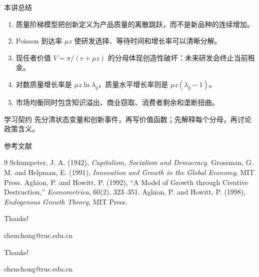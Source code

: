 \documentclass[aspectratio=32]{beamer}
\begin{document}
\begin{frame}{本讲总结}
\small
\begin{enumerate}
  \item 质量阶梯模型把创新定义为产品质量的离散跳跃，而不是新品种的连续增加。
  \item Poisson 到达率 $\mu z$ 使研发选择、等待时间和增长率可以清晰分解。
  \item 现任者价值 $V=\pi/(r+\mu z)$ 的分母体现创造性破坏：未来研发会终止当前租金。
  \item 对数质量增长率是 $\mu z\ln\lambda_q$，质量水平增长率则是 $\mu z(\lambda_q-1)$。
  \item 市场均衡同时包含知识溢出、商业窃取、消费者剩余和垄断扭曲。
\end{enumerate}
\begin{block}{学习契约}
先分清状态变量和创新事件，再写价值函数；先解释每个分母，再讨论政策含义。
\end{block}
\end{frame}

\begin{frame}{参考文献}
\scriptsize
\begin{thebibliography}{9}
 Schumpeter, J. A. (1942), \emph{Capitalism, Socialism and Democracy}.
 Grossman, G. M. and Helpman, E. (1991), \emph{Innovation and Growth in the Global Economy}, MIT Press.
 Aghion, P. and Howitt, P. (1992), ``A Model of Growth through Creative Destruction,'' \emph{Econometrica}, 60(2), 323--351.
 Aghion, P. and Howitt, P. (1998), \emph{Endogenous Growth Theory}, MIT Press.
\end{thebibliography}
\vfill
\begin{center}
{\color{LectureBlue}\Huge Thanks!}\par
\vspace{0.16cm}
\large chenchong@ruc.edu.cn
\end{center}
\end{frame}

\begin{frame}[plain]
\begin{center}
\vfill
{\color{LectureBlue}\Huge Thanks!}\par
\vspace{0.35cm}
\large chenchong@ruc.edu.cn
\vfill
\end{center}
\end{frame}
\end{document}
